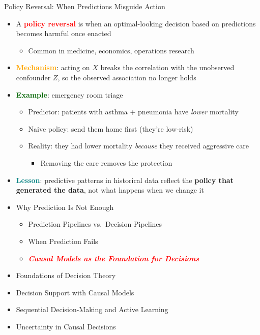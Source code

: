 \documentclass[
  10pt,
  ignorenonframetext,
]{beamer}
\providecommand{\tightlist}{%
  \setlength{\itemsep}{0pt}\setlength{\parskip}{0pt}}
\begin{document}
\begin{frame}{Policy Reversal: When Predictions Misguide Action}
\label{policy-reversal-when-predictions-misguide-action}
\begin{itemize}
\item
  A \textbf{\textcolor{red}{policy reversal}} is when an optimal-looking
  decision based on predictions becomes harmful once enacted

  \begin{itemize}
  \tightlist
  \item
    Common in medicine, economics, operations research
  \end{itemize}
\item
  \textbf{\textcolor{orange}{Mechanism}}: acting on \(X\) breaks the
  correlation with the unobserved confounder \(Z\), so the observed
  association no longer holds
\item
  \textbf{\textcolor{darkgreen}{Example}}: emergency room triage

  \begin{itemize}
  \tightlist
  \item
    Predictor: patients with asthma + pneumonia have \emph{lower}
    mortality
  \item
    Naive policy: send them home first (they're low-risk)
  \item
    Reality: they had lower mortality \emph{because} they received
    aggressive care

    \begin{itemize}
    \tightlist
    \item
      Removing the care removes the protection
    \end{itemize}
  \end{itemize}
\item
  \textbf{\textcolor{teal}{Lesson}}: predictive patterns in historical
  data reflect the \textbf{policy that generated the data}, not what
  happens when we change it
\end{itemize}
\end{frame}

\begin{frame}{}
\label{section-3}
\begin{itemize}
\tightlist
\item
  Why Prediction Is Not Enough

  \begin{itemize}
  \tightlist
  \item
    Prediction Pipelines vs.~Decision Pipelines
  \item
    When Prediction Fails
  \item
    \emph{\textbf{\textcolor{red}{Causal Models as the Foundation for Decisions}}}
  \end{itemize}
\item
  Foundations of Decision Theory
\item
  Decision Support with Causal Models
\item
  Sequential Decision-Making and Active Learning
\item
  Uncertainty in Causal Decisions
\end{itemize}
\end{frame}
\end{document}
